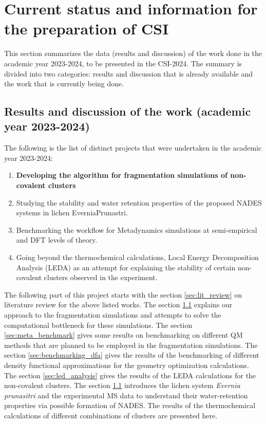 \section{Current status and information for the preparation of CSI}
\label{sec:csi_info}
This section summarizes the data (results and discussion) of the work done in the academic year 2023-2024, to be presented in the CSI-2024. 
The summary is divided into two categories: results and discussion that is already available and the work that is currently being done.
\subsection{Results and discussion of the work (academic year 2023-2024)}
The following is the list of distinct projects that were undertaken in the academic year 2023-2024:
\begin{enumerate}
    \item \textbf{Developing the algorithm for fragmentation simulations of non-covalent clusters}
    \item Studying the stability and water retention properties of the proposed NADES systems in lichen EverniaPrunastri.
    \item Benchmarking the workflow for Metadynamics simulations at semi-empirical and DFT levels of theory.
    \item Going beyond the thermochemical calculations, Local Energy Decomposition Analysis (LEDA) as an attempt for explaining the stability of certain non-covalent clusters observed in the experiment.
\end{enumerate}
The following part of this project starts with the section \ref{sec:lit_review} on literature review for the above listed works. The section \ref{} explains our approach to the fragmentation simulations and attempts to solve the computational bottleneck for these simulations.
The section \ref{sec:meta_benchmark} gives some results on benchmarking on different QM methods that are planned to be employed in the fragmentation simulations.
The section \ref{sec:benchmarking_dfa} gives the results of the benchmarking of different density functional approximations for the geometry optimization calculations.
The section \ref{sec:led_analysis} gives the results of the LEDA calculations for the non-covalent clusters.
The section \ref{} introduces the lichen system \textit{Evernia prunasitri} and the experimental MS data to understand their water-retention properties via possible formation of NADES. The results of the thermochemical calculations of different combinations of clusters are presented here.
